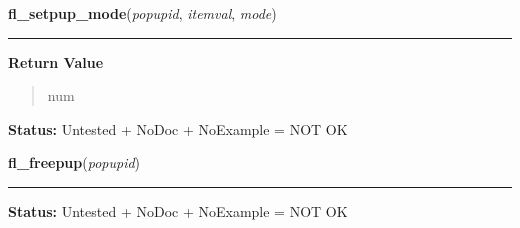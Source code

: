     \label{xformslib:library:fl_setpup_mode}

    \vspace{0.5ex}

\hspace{.8\funcindent}\begin{boxedminipage}{\funcwidth}

    \raggedright \textbf{fl\_setpup\_mode}(\textit{popupid}, \textit{itemval}, \textit{mode})

    \vspace{-1.5ex}

    \rule{\textwidth}{0.5\fboxrule}
\setlength{\parskip}{2ex}
\setlength{\parskip}{1ex}
      \textbf{Return Value}
    \vspace{-1ex}

      \begin{quote}
      num

      \end{quote}

\textbf{Status:} Untested + NoDoc + NoExample = NOT OK



    \end{boxedminipage}

    \label{xformslib:library:fl_freepup}

    \vspace{0.5ex}

\hspace{.8\funcindent}\begin{boxedminipage}{\funcwidth}

    \raggedright \textbf{fl\_freepup}(\textit{popupid})

    \vspace{-1.5ex}

    \rule{\textwidth}{0.5\fboxrule}
\setlength{\parskip}{2ex}
\setlength{\parskip}{1ex}
\textbf{Status:} Untested + NoDoc + NoExample = NOT OK



    \end{boxedminipage}

    \label{xformslib:library:fl_dopup}

